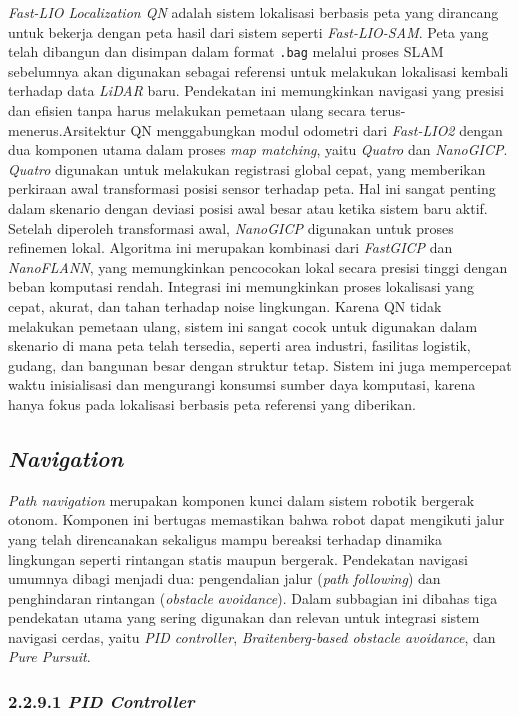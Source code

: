 \emph{Fast-LIO Localization QN} adalah sistem lokalisasi berbasis peta yang dirancang untuk bekerja dengan peta hasil dari sistem seperti \emph{Fast-LIO-SAM}. Peta yang telah dibangun dan disimpan dalam format \texttt{.bag} melalui proses SLAM sebelumnya akan digunakan sebagai referensi untuk melakukan lokalisasi kembali terhadap data \emph{LiDAR} baru. Pendekatan ini memungkinkan navigasi yang presisi dan efisien tanpa harus melakukan pemetaan ulang secara terus-menerus.Arsitektur QN menggabungkan modul odometri dari \emph{Fast-LIO2} dengan dua komponen utama dalam proses \emph{map matching}, yaitu \emph{Quatro} dan \emph{NanoGICP}. \emph{Quatro} digunakan untuk melakukan registrasi global cepat, yang memberikan perkiraan awal transformasi posisi sensor terhadap peta. Hal ini sangat penting dalam skenario dengan deviasi posisi awal besar atau ketika sistem baru aktif. Setelah diperoleh transformasi awal, \emph{NanoGICP} digunakan untuk proses refinemen lokal. Algoritma ini merupakan kombinasi dari \emph{FastGICP} dan \emph{NanoFLANN}, yang memungkinkan pencocokan lokal secara presisi tinggi dengan beban komputasi rendah. Integrasi ini memungkinkan proses lokalisasi yang cepat, akurat, dan tahan terhadap noise lingkungan. Karena QN tidak melakukan pemetaan ulang, sistem ini sangat cocok untuk digunakan dalam skenario di mana peta telah tersedia, seperti area industri, fasilitas logistik, gudang, dan bangunan besar dengan struktur tetap. Sistem ini juga mempercepat waktu inisialisasi dan mengurangi konsumsi sumber daya komputasi, karena hanya fokus pada lokalisasi berbasis peta referensi yang diberikan\cite{fastlio2023qnloc}.


\subsection{\emph{Navigation}}
\emph{Path navigation} merupakan komponen kunci dalam sistem robotik bergerak otonom. Komponen ini bertugas memastikan bahwa robot dapat mengikuti jalur yang telah direncanakan sekaligus mampu bereaksi terhadap dinamika lingkungan seperti rintangan statis maupun bergerak. Pendekatan navigasi umumnya dibagi menjadi dua: pengendalian jalur (\emph{path following}) dan penghindaran rintangan (\emph{obstacle avoidance}). Dalam subbagian ini dibahas tiga pendekatan utama yang sering digunakan dan relevan untuk integrasi sistem navigasi cerdas, yaitu \emph{PID controller}, \emph{Braitenberg-based obstacle avoidance}, dan \emph{Pure Pursuit}.

\subsubsection{2.2.9.1 \emph{PID Controller}}

